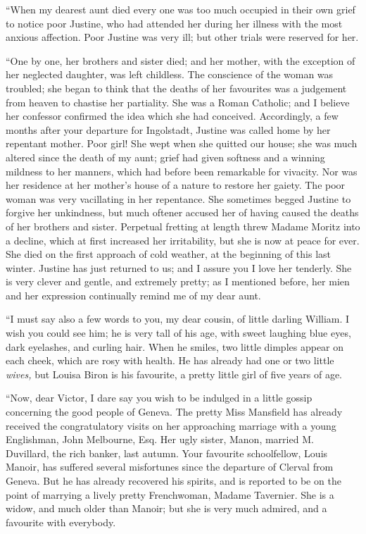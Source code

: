 \documentclass[12pt,openright]{book}
\begin{document}
“When my dearest aunt died every one was too much occupied in their own grief to notice poor Justine, who had attended her during her illness with the most anxious affection. Poor Justine was very ill; but other trials were reserved for her.

“One by one, her brothers and sister died; and her mother, with the exception of her neglected daughter, was left childless. The conscience of the woman was troubled; she began to think that the deaths of her favourites was a judgement from heaven to chastise her partiality. She was a Roman Catholic; and I believe her confessor confirmed the idea which she had conceived. Accordingly, a few months after your departure for Ingolstadt, Justine was called home by her repentant mother. Poor girl! She wept when she quitted our house; she was much altered since the death of my aunt; grief had given softness and a winning mildness to her manners, which had before been remarkable for vivacity. Nor was her residence at her mother’s house of a nature to restore her gaiety. The poor woman was very vacillating in her repentance. She sometimes begged Justine to forgive her unkindness, but much oftener accused her of having caused the deaths of her brothers and sister. Perpetual fretting at length threw Madame Moritz into a decline, which at first increased her irritability, but she is now at peace for ever. She died on the first approach of cold weather, at the beginning of this last winter. Justine has just returned to us; and I assure you I love her tenderly. She is very clever and gentle, and extremely pretty; as I mentioned before, her mien and her expression continually remind me of my dear aunt.

“I must say also a few words to you, my dear cousin, of little darling William. I wish you could see him; he is very tall of his age, with sweet laughing blue eyes, dark eyelashes, and curling hair. When he smiles, two little dimples appear on each cheek, which are rosy with health. He has already had one or two little \textit{wives,} but Louisa Biron is his favourite, a pretty little girl of five years of age.

“Now, dear Victor, I dare say you wish to be indulged in a little gossip concerning the good people of Geneva. The pretty Miss Mansfield has already received the congratulatory visits on her approaching marriage with a young Englishman, John Melbourne, Esq. Her ugly sister, Manon, married M. Duvillard, the rich banker, last autumn. Your favourite schoolfellow, Louis Manoir, has suffered several misfortunes since the departure of Clerval from Geneva. But he has already recovered his spirits, and is reported to be on the point of marrying a lively pretty Frenchwoman, Madame Tavernier. She is a widow, and much older than Manoir; but she is very much admired, and a favourite with everybody.
\end{document}

